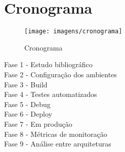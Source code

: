 \chapter{Cronograma}

\begin{figure}[!htb]
  \centering
  \texttt{[image: imagens/cronograma]}
  \caption{Cronograma}
  \label{Rotulo}
\end{figure}



Fase 1 - Estudo bibliográfico
\\
Fase 2 - Configuração dos ambientes
\\
Fase 3 - Build
\\
Fase 4 - Testes automatizados
\\
Fase 5 - Debug
\\
Fase 6 - Deploy
\\
Fase 7 - Em produção
\\
Fase 8 - Métricas de monitoração
\\
Fase 9 - Análise entre arquiteturas

